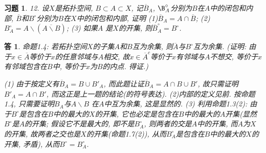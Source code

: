 \documentclass{ctexart}%
\newtheorem*{exercise}{习题}
\newtheorem*{solution}{答}
\theoremstyle{definition}
\theoremstyle{remark}
\begin{document}
\begin{exercise}12. 设$X$是拓扑空间, $B\subset A\subset X$, 记$\overline{B}_A$, $\B^\circ_A$分别为$B$在$A$中的闭包和内部, $\overline{B}$和$B^\circ$分别为$B$在$X$中的闭包和内部, 证明 (1)$\overline{B}_A
=A\cap \overline{B}$; (2)$B^\circ_A=A\backslash (\overline{A\backslash B})$; (3) 如果$A$ 是$X$的开集, 则$\overline{B}^\circ_A=B^\circ$. 
\end{exercise}
\begin{solution}
命题1.4: 若拓扑空间$X$的子集$A$和$B$互为余集, 则$\overline{A}$与$B^\circ$互为余集. (证明: 由于$x\in\overline{A}$等价于$x$的任意邻域与$A$相交, 故$x\in \overline{A}^c$等价于$x$有邻域与$A$不想交, 等价于$x$有邻域包含在$B$中, 等价于$x$为$B$的内点. 得证.)

(1) 由于按定义有$\overline{B}_A=B\cup B'_A$, 而此题让证$\overline{B}_A=A\cap B\cup B'$, 故只需证明$ B'_A=A\cap B'$, 而这正是上一题的结论(的符号表达). (2)内部的定义见前. 按命题1.4, 只需要证明$B_A$与$A\backslash B$ 在$A$中互为余集, 这是显然的.  (3) 利用命题1.3(2): 
由于$B^\circ$是包含在$B$中的最大的$X$的开集, 它也必定是包含在$B$中的最大的$A$开集(显然$B^\circ$是$A$的开集; 假设它不是最大的, 即不是$B^\circ_A$, 则两者的交是$A$中的开集, 而$A$为$X$的开集, 故两者之交也是$X$的开集(命题1.7(2)), 从而$B^\circ_A$是包含在$B$中的最大的$X$的开集, 矛盾), 从而$B^\circ=B^\circ_A$.  
\end{solution}
\end{document}
